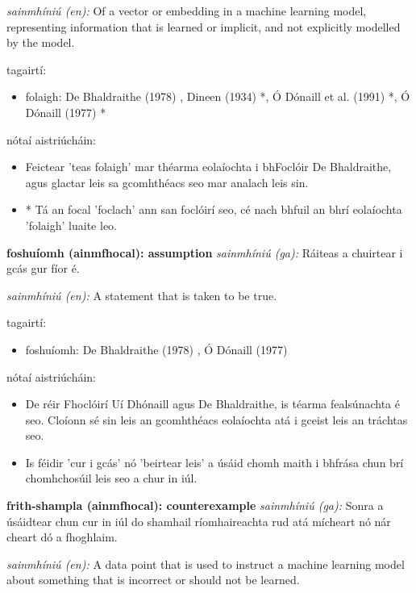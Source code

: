 \documentclass{article}
\begin{document}
\textit{sainmhíniú (en):} Of a vector or embedding in a machine learning model, representing information that is learned or implicit, and not explicitly modelled by the model.

tagairtí:
\begin{itemize}
	\item folaigh: De Bhaldraithe (1978) \cite{de-bhaldraithe}, Dineen (1934) \cite{dineen}*, Ó Dónaill et al. (1991) \cite{focloir-beag}*, Ó Dónaill (1977) \cite{odonaill}*
\end{itemize}

nótaí aistriúcháin:
\begin{itemize}
	\item Feictear 'teas folaigh' mar théarma eolaíochta i bhFoclóir De Bhaldraithe, agus glactar leis sa gcomhthéacs seo mar analach leis sin.
	\item * Tá an focal 'foclach' ann san foclóirí seo, cé nach bhfuil an bhrí eolaíochta 'folaigh' luaite leo.
\end{itemize}


\textbf{foshuíomh (ainmfhocal): assumption}
\textit{sainmhíniú (ga):} Ráiteas a chuirtear i gcás gur fíor é.

\textit{sainmhíniú (en):} A statement that is taken to be true.

tagairtí:
\begin{itemize}
	\item foshuíomh: De Bhaldraithe (1978) \cite{de-bhaldraithe}, Ó Dónaill (1977) \cite{odonaill}
\end{itemize}

nótaí aistriúcháin:
\begin{itemize}
	\item De réir Fhoclóirí Uí Dhónaill agus De Bhaldraithe, is téarma fealsúnachta é seo. Cloíonn sé sin leis an gcomhthéacs eolaíochta atá i gceist leis an tráchtas seo.
	\item Is féidir 'cur i gcás' nó 'beirtear leis' a úsáid chomh maith i bhfrása chun brí chomhchosúil leis seo a chur in iúl.
\end{itemize}


\textbf{frith-shampla (ainmfhocal): counterexample}
\textit{sainmhíniú (ga):} Sonra a úsáidtear chun cur in iúl do shamhail ríomhaireachta rud atá mícheart nó nár cheart dó a fhoghlaim.

\textit{sainmhíniú (en):} A data point that is used to instruct a machine learning model about something that is incorrect or should not be learned.
\end{document}
